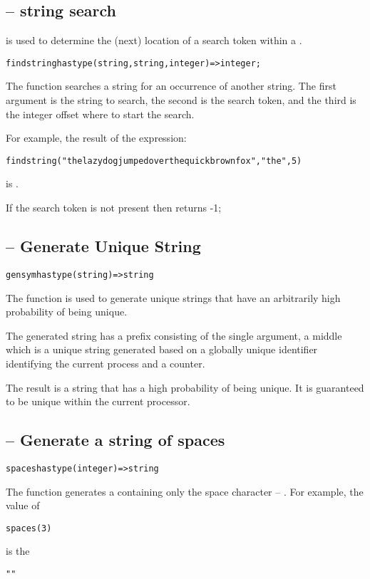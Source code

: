 \subsection{ -- string search}
\label{findStringFunction}
 is used to determine the (next) location of a search token within a .
\begin{alltt}
findstring has type (string,string,integer)=>integer;
\end{alltt}

The  function searches a string for an occurrence of another string. The first argument is the string to search, the second is the search token, and the third is the integer offset where to start the search.

For example, the result of the expression:
\begin{alltt}
findstring("the lazy dog jumped over the quick brown fox","the",5)
\end{alltt}
is .

If the search token is not present then  returns -1;

\subsection{ -- Generate Unique String}
\label{gensym}
\begin{alltt}
gensym has type (string)=>string
\end{alltt}
The  function is used to generate unique strings that have an arbitrarily high probability of being unique.

The generated string has a prefix consisting of the single argument, a middle which is a unique string generated based on a globally unique identifier identifying the current process and a counter.

The result is a string that has a high probability of being unique. It is guaranteed to be unique within the current processor.

\subsection{ -- Generate a string of spaces}
\label{spaces}
\begin{alltt}
spaces has type (integer)=>string
\end{alltt}

The  function generates a  containing only the space character -- . For example, the value of
\begin{alltt}
spaces(3)
\end{alltt} 
is the 
\begin{alltt}
"   "
\end{alltt}
